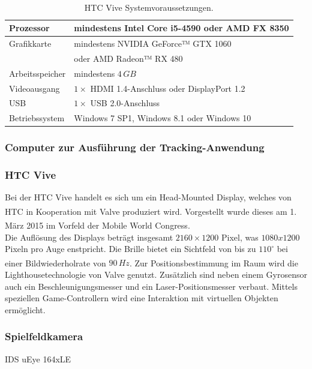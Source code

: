 \begin{table}
	\centering
	\begin{tabular}{l|l}
		Prozessor & mindestens Intel Core i5-4590 oder AMD FX 8350\\
		\hline
		Grafikkarte & mindestens NVIDIA GeForce™ GTX 1060\\
		&oder AMD Radeon™ RX 480\\
		\hline
		Arbeitsspeicher & mindestens $4\,GB$\\		
		\hline
		Videoausgang & $1\times$ HDMI 1.4-Anschluss oder DisplayPort 1.2\\
		\hline
		USB & $1\times$ USB 2.0-Anschluss\\
		\hline
		Betriebssystem & Windows 7 SP1, Windows 8.1 oder Windows 10\\
	\end{tabular}
	\caption{HTC Vive Systemvoraussetzungen.\textsuperscript{\cite{website:HTC_Vive_Ready}}}
	\label{table:viveReq}
\end{table}

\subsubsection{Computer zur Ausführung der Tracking-Anwendung}
\subsubsection{HTC Vive} 
Bei der HTC Vive handelt es sich um ein Head-Mounted Display, welches von HTC in Kooperation mit Valve\textsuperscript{\cite{website:Valve}} produziert wird. Vorgestellt wurde dieses am 1. März 2015 im Vorfeld der Mobile World Congress\textsuperscript{\cite{website:mobileworldcongress}}.\\
Die Auflösung des Displays beträgt insgesamt $2160\times1200$ Pixel, was $1080x1200$ Pixeln pro Auge enstpricht. Die Brille bietet ein Sichtfeld von bis zu $110^\circ$ bei einer Bildwiederholrate von $90\,Hz$\textsuperscript{\cite{website:HTC_Vive}}. Zur Positionsbestimmung im Raum wird die Lighthousetechnologie von Valve genutzt. Zusätzlich sind neben einem Gyrosensor auch ein Beschleunigungsmesser und ein Laser-Positionsmesser verbaut. Mittels speziellen Game-Controllern wird eine Interaktion mit virtuellen Objekten ermöglicht.

\subsubsection{Spielfeldkamera} 
IDS uEye 164xLE

